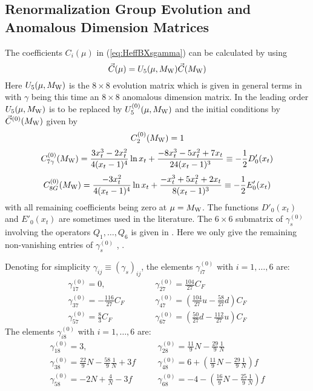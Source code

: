 \subsection{Renormalization Group Evolution and Anomalous Dimension Matrices}
         \label{sec:Heff:BXsgamma:RGE}
The coefficients $C_i(\mu)$ in (\ref{eq:HeffBXsgamma}) can be calculated
by using
\begin{equation}
\vec C(\mu)= U_5(\mu,M_{\rm W})\vec C(M_{\rm W})
\end{equation}
Here $ U_5(\mu,M_{\rm W})$ is the $8\times 8$ evolution matrix which is
given in general terms in  with $\gamma$ being this
time an $8\times 8$ anomalous dimension matrix. In the leading order
$U_5(\mu,M_{\rm W})$ is to be replaced by $U_5^{(0)}(\mu,M_{\rm W})$ and
the initial conditions by $\vec C^{(0)}(M_{\rm W})$ given by \cite{Grin}
\begin{equation}\label{c2}
C^{(0)}_2(M_{\rm W}) = 1                               
\end{equation}
\begin{equation}\label{c7}
C^{(0)}_{7\gamma} (M_{\rm W}) = \frac{3 x_t^3-2 x_t^2}{4(x_t-1)^4}\ln x_t + 
   \frac{-8 x_t^3 - 5 x_t^2 + 7 x_t}{24(x_t-1)^3}
   \equiv -\frac{1}{2} D'_0(x_t)
\end{equation}
\begin{equation}\label{c8}
C^{(0)}_{8G}(M_{\rm W}) = \frac{-3 x_t^2}{4(x_t-1)^4}\ln x_t +
   \frac{-x_t^3 + 5 x_t^2 + 2 x_t}{8(x_t-1)^3}                               
   \equiv -\frac{1}{2} E'_0(x_t)
\end{equation}
with all remaining coefficients being zero at $\mu=M_{\rm W}$. The functions
$D'_0(x_t)$ and $E'_0(x_t)$ are sometimes used in the literature. The
$6 \times 6$ submatrix of $\gamma^{(0)}_s$ involving the operators
$Q_1,\ldots,Q_6$ is given in . Here we only give the
remaining non-vanishing entries of $\gamma^{(0)}_s$
\cite{CFMRS:93}, \cite{CFRS:94}.

Denoting for simplicity $\gamma_{ij} \equiv (\gamma_s)_{ij}$, the elements
$\gamma^{(0)}_{i7}$ with $i=1,\ldots,6$ are:
\begin{eqnarray}
\gamma^{(0)}_{17} = 0, &\qquad&  \gamma^{(0)}_{27} =
\frac{104}{27} C_F
\label{eq:g0127} \\
\gamma^{(0)}_{37} = -\frac{116}{27} C_F
 &\qquad&  \gamma^{(0)}_{47}  = \left(\frac{104}{27} u -\frac{58}{27}d
\right) C_F
\label{eq:g0347} \\
\gamma^{(0)}_{57} = \frac{8}{3} C_F &\qquad&
\gamma^{(0)}_{67} = \left( \frac{50}{27}d -\frac{112}{27}u \right) C_F
\label{eq:g0567}
\end{eqnarray}
The elements $\gamma^{(0)}_{i8}$ with $i=1,\ldots,6$ are:
\begin{eqnarray}
\gamma^{(0)}_{18} = 3, &\quad& \gamma^{(0)}_{28} =
\frac{11}{9} N-\frac{29}{9}\frac{1}{N}
\label{eq:g0128} \\
\gamma^{(0)}_{38} = \frac{22}{9} N-\frac{58}{9}\frac{1}{N}+3 f
 &\quad& \gamma^{(0)}_{48}  = 
6+\left(\frac{11}{9} N -\frac{29}{9}\frac{1}{N}\right) f
\label{eq:g0348} \\
\gamma^{(0)}_{58} = -2 N+\frac{4}{N} -3 f  &\quad&
\gamma^{(0)}_{68} = -4-\left( \frac{16}{9} N -
\frac{25}{9}\frac{1}{N}\right) f
\label{eq:g0568}
\end{eqnarray}

